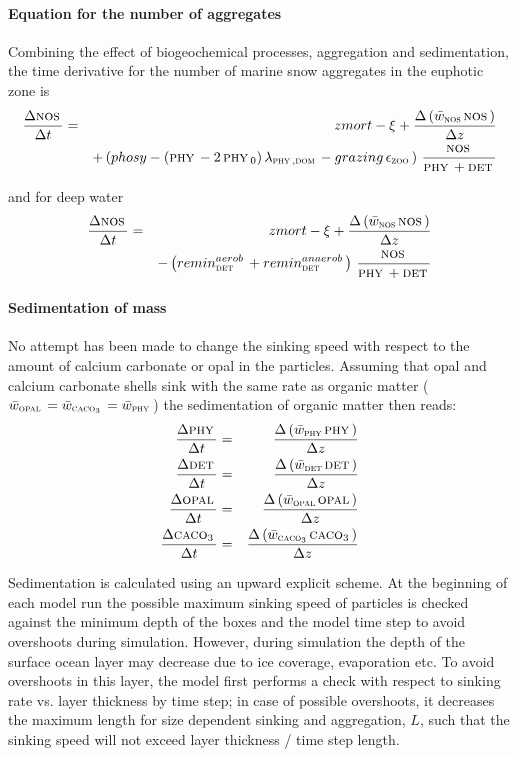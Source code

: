 \documentclass[11pt,a4paper,fleqn,twoside]{article}
\def\dom{\text{\textsc{dom}}\,}
\def\phy{\text{\textsc{phy}}\,}
\def\zoo{\text{\textsc{zoo}}\,}
\def\det{\text{\textsc{det}}\,}
\def\opal{\text{\textsc{opal}}\,}
\def\cal{\text{\textsc{caco$_3$}}\,}
\def\nos{\text{\textsc{nos}}\,}
\begin{document}
\paragraph{Equation for the number of aggregates}  Combining the effect of biogeochemical processes,
aggregation and sedimentation, the time derivative for the number of marine snow
aggregates in the euphotic zone is 
\begin{eqnarray}
\label{eq_nos_surface}
\frac{\Delta \nos}{\Delta  t} & = & 
 zmort - \xi + \frac{\Delta \left(\bar{w}_{\nos} \nos\right)}{\Delta z}\\
&&+ \left( phosy - \left(\phy-2\,\phy_0\right) \lambda_{\phy,\dom}
- grazing \, \epsilon_\zoo 
\right) \, \frac{\nos}{\phy+\det} \nonumber 
\end{eqnarray}

and for deep water 
\begin{eqnarray}
\label{eq_nos_deep}
\frac{\Delta \nos}{\Delta  t} & = & 
 zmort - \xi + \frac{\Delta \left(\bar{w}_{\nos} \nos\right)}{\Delta z}\\
&& - \left( remin^{aerob}_\det+remin^{anaerob}_\det \right) \, \frac{\nos}{\phy+\det} \nonumber 
\end{eqnarray}


\paragraph{Sedimentation of mass} No attempt has been made to change the
sinking speed with respect to the amount of calcium carbonate or opal in the
particles. Assuming that opal and calcium carbonate shells sink with the same
rate as organic matter ($\bar{w}_{\opal} = \bar{w}_{\cal} = \bar{w}_{\phy}$)
the sedimentation of organic matter then reads:
\begin{eqnarray}
\frac{\Delta \phy}{\Delta  t} & = & \frac{\Delta \left(\bar{w}_{\phy} \phy\right)}{\Delta z}\\
\frac{\Delta \det}{\Delta  t} & = & \frac{\Delta \left(\bar{w}_{\det} \det\right)}{\Delta z}\\
\frac{\Delta \opal}{\Delta  t} & = & \frac{\Delta \left(\bar{w}_{\opal} \opal\right)}{\Delta z}\\
\frac{\Delta \cal}{\Delta  t} & = & \frac{\Delta \left(\bar{w}_{\cal} \cal\right)}{\Delta z}
\end{eqnarray}

Sedimentation is calculated using an upward explicit scheme. At the beginning
of each model run the possible maximum sinking speed of particles is checked
against the minimum depth of the boxes and the model time step to avoid
overshoots during simulation.  However, during simulation the depth of the
surface ocean layer may decrease due to ice coverage, evaporation etc. To avoid
overshoots in this layer, the model first performs a check with respect to
sinking rate vs. layer thickness by time step; in case of possible overshoots, it
decreases the maximum length for size dependent sinking and aggregation, $L$,
such that the sinking speed will not exceed layer thickness / time step length.
\end{document}
